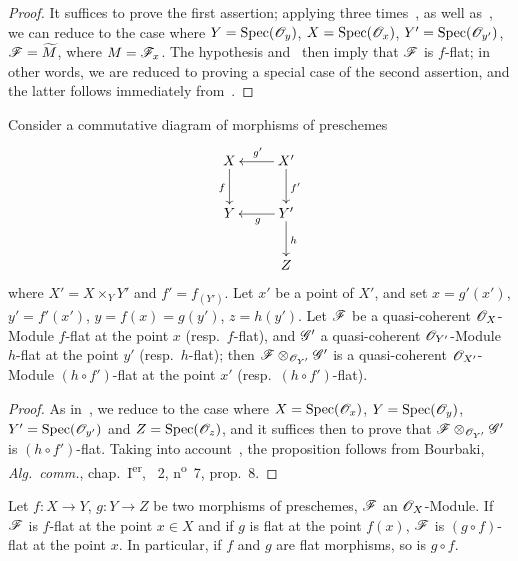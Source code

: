 \begin{proof}
It suffices to prove the first assertion; applying three times~, as well as~, we can reduce to the case where $Y=\operatorname{Spec}(\mathscr{O}_y)$, $X=\operatorname{Spec}(\mathscr{O}_x)$, $Y'=\operatorname{Spec}(\mathscr{O}_{y'})$, $\mathscr{F}=\widetilde{M}$, where $M=\mathscr{F}_x$.
The hypothesis and~ then imply that $\mathscr{F}$ is $f$-flat; in other words, we are reduced to proving a special case of the second assertion, and the latter follows immediately from~.
\end{proof}

\begin{proposition}[2.1.5]
\label{IV.2.1.5}
Consider a commutative diagram of morphisms of preschemes
\[
\xymatrix{
  X \ar[d]_f & X' \ar[l]_{g'} \ar[d]^{f'} \\
  Y & Y' \ar[l]^g \ar[d]^h \\
  & Z
}
\]
where $X'=X\times_Y Y'$ and $f'=f_{(Y')}$.
Let $x'$ be a point of $X'$, and set $x=g'(x')$, $y'=f'(x')$, $y=f(x)=g(y')$, $z=h(y')$.
Let $\mathscr{F}$ be a quasi-coherent $\mathscr{O}_X$-Module $f$-flat at the point $x$ \textnormal{(}resp.\ $f$-flat\textnormal{)}, and $\mathscr{G}'$ a quasi-coherent $\mathscr{O}_{Y'}$-Module $h$-flat at the point $y'$ \textnormal{(}resp.\ $h$-flat\textnormal{)}; then $\mathscr{F}\otimes_{\mathscr{O}_{Y'}}\mathscr{G}'$ is a quasi-coherent $\mathscr{O}_{X'}$-Module $(h\circ f')$-flat at the point $x'$ \textnormal{(}resp.\ $(h\circ f')$-flat\textnormal{)}.
\end{proposition}

\begin{proof}
As in~, we reduce to the case where $X=\operatorname{Spec}(\mathscr{O}_x)$, $Y=\operatorname{Spec}(\mathscr{O}_y)$,
$Y'=\operatorname{Spec}(\mathscr{O}_{y'})$ and $Z=\operatorname{Spec}(\mathscr{O}_z)$, and it suffices then to prove that $\mathscr{F}\otimes_{\mathscr{O}_{Y'}}\mathscr{G}'$ is $(h\circ f')$-flat.
Taking into account~, the proposition follows from Bourbaki, \emph{Alg.~comm.}, chap.~I\textsuperscript{er}, \textsection~2, n\textsuperscript{o}~7, prop.~8.
\end{proof}

\begin{corollary}[2.1.6]
\label{IV.2.1.6}
Let $f:X\to Y$, $g:Y\to Z$ be two morphisms of preschemes, $\mathscr{F}$ an $\mathscr{O}_X$-Module. If $\mathscr{F}$ is $f$-flat at the point $x\in X$ and if $g$ is flat at the point $f(x)$, $\mathscr{F}$ is $(g\circ f)$-flat at the point $x$.
In particular, if $f$ and $g$ are flat morphisms, so is $g\circ f$.
\end{corollary}

